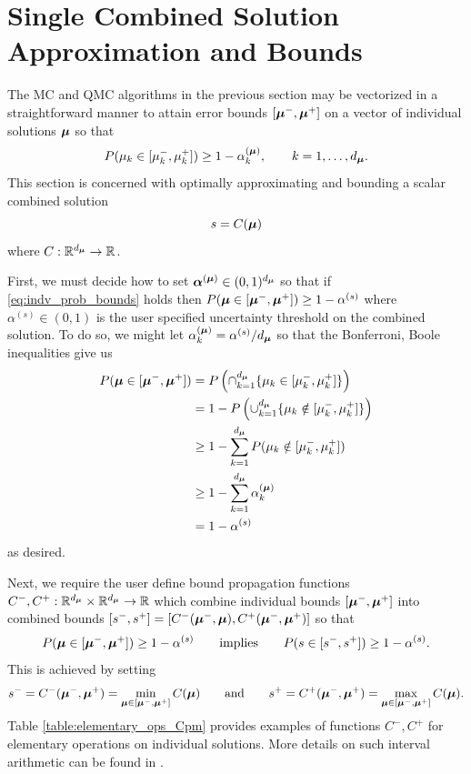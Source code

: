 \documentclass{article}[12pt]
\begin{document}
\section{Single Combined Solution Approximation and Bounds}

The MC and QMC algorithms in the previous section may be vectorized in a straightforward manner to attain error bounds $[\boldsymbol{\mu}^-,\boldsymbol{\mu}^+]$ on a vector of individual solutions $\boldsymbol{\mu}$ so that 
\begin{equation}
    P(\mu_k \in [\mu_k^-,\mu_k^+]) \geq 1-\alpha_k^{(\boldsymbol{\mu})},  \qquad k=1,\dots,d_{\boldsymbol{\mu}}.
    \label{eq:indv_prob_bounds}
\end{equation}
This section is concerned with optimally approximating and bounding a scalar combined solution 
$$s=C(\boldsymbol{\mu})$$
where $C: \mathbb{R}^{d_{\boldsymbol{\mu}}} \to \mathbb{R}$. 

First, we  must decide how to set $\boldsymbol{\alpha}^{(\boldsymbol{\mu})} \in (0,1)^{d_{\boldsymbol{\mu}}}$ so that if \eqref{eq:indv_prob_bounds} holds then $P(\boldsymbol{\mu} \in [\boldsymbol{\mu}^-,\boldsymbol{\mu}^+]) \geq 1-\alpha^{(s)}$ where $\alpha^{(s)} \in (0,1)$ is the user specified uncertainty threshold on the combined solution. To do so, we might let $\alpha_k^{(\boldsymbol{\mu})} = \alpha^{(s)}/d_{\boldsymbol{\mu}}$ so that the Bonferroni, Boole inequalities give us 
\begin{align*}
    P(\boldsymbol{\mu} \in [\boldsymbol{\mu}^-,\boldsymbol{\mu}^+])
    &= P\left(\cap_{k=1}^{d_{\boldsymbol{\mu}}} \{\mu_k \in [\mu^-_k,\mu^+_k]\}\right) \\
    &= 1-P\left(\cup_{k=1}^{d_{\boldsymbol{\mu}}} \{\mu_k \notin [\mu^-_k,\mu^+_k]\}\right) \\
    &\geq 1-\sum_{k=1}^{d_{\boldsymbol{\mu}}} P(\mu_k \notin [\mu_k^-,\mu_k^+]) \\
    &\geq 1-\sum_{k=1}^{d_{\boldsymbol{\mu}}} \alpha_k^{(\boldsymbol{\mu})} \\
    &= 1-\alpha^{(s)}
\end{align*}
as desired. 

Next, we require the user define bound propagation functions $C^-,C^+: \mathbb{R}^{d_{\boldsymbol{\mu}}} \times \mathbb{R}^{d_{\boldsymbol{\mu}}} \to \mathbb{R}$ which combine individual bounds $[\boldsymbol{\mu}^-,\boldsymbol{\mu}^+]$ into combined bounds $[s^-,s^+] = [C^-(\boldsymbol{\mu}^-,\boldsymbol{\mu}),C^+(\boldsymbol{\mu}^-,\boldsymbol{\mu}^+)]$ so that 
$$P(\boldsymbol{\mu} \in [\boldsymbol{\mu}^-,\boldsymbol{\mu}^+]) \geq 1-\alpha^{(s)} \qquad\text{implies}\qquad  P(s \in [s^-,s^+]) \geq 1-\alpha^{(s)}.$$ This is achieved by setting
\begin{equation*}
    s^- = C^-(\boldsymbol{\mu}^-,\boldsymbol{\mu}^+) = \min_{\boldsymbol{\mu} \in [\boldsymbol{\mu}^-,\boldsymbol{\mu}^+]} C(\boldsymbol{\mu}) \qquad\text{and}\qquad s^+ = C^+(\boldsymbol{\mu}^-,\boldsymbol{\mu}^+) = \max_{\boldsymbol{\mu} \in [\boldsymbol{\mu}^-,\boldsymbol{\mu}^+]} C(\boldsymbol{\mu}).
\end{equation*}
Table \ref{table:elementary_ops_Cpm} provides examples of functions $C^-,C^+$ for elementary operations on individual solutions. More details on such interval arithmetic can be found in \cite{interval_analysis}.
 
\end{document}
